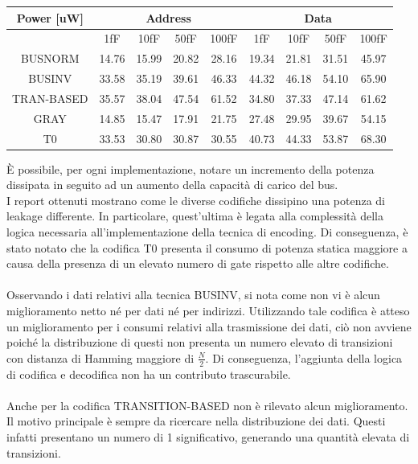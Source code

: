 \documentclass[11pt,  english, makeidx, a4paper, titlepage, oneside]{book}
\begin{document}
\begin{center}
	\begin{tabular}{|c|c|c|c|c||c|c|c|c|}
	\hline
	Power [uW] & \multicolumn{4}{|c||}{Address} & \multicolumn{4}{|c|}{Data}\\
	\hline
	 & 1fF & 10fF & 50fF & 100fF & 1fF & 10fF & 50fF & 100fF \\
	\hline
	BUSNORM & 14.76 & 15.99 & 20.82 & 28.16 & 19.34 & 21.81 & 31.51 & 45.97 \\
	 \hline
	BUSINV & 33.58 & 35.19 & 39.61 & 46.33 & 44.32 & 46.18 & 54.10 & 65.90 \\
	\hline
	TRAN-BASED & 35.57 & 38.04 & 47.54 & 61.52 & 34.80 & 37.33 & 47.14 & 61.62 \\
	\hline
	GRAY & 14.85 & 15.47 & 17.91 & 21.75 & 27.48 & 29.95 & 39.67 & 54.15 \\
	\hline
	T0 & 33.53 & 30.80 & 30.87 & 30.55 & 40.73 & 44.33 & 53.87 & 68.30 \\
	\hline
	\end{tabular}	
\end{center}
\vspace{0.3cm}
È possibile, per ogni implementazione, notare un incremento della potenza dissipata in seguito ad un aumento della capacità di carico del bus.
\\
I report ottenuti mostrano come le diverse codifiche dissipino una potenza di leakage differente. In particolare, quest'ultima è legata alla complessità della logica necessaria all'implementazione della tecnica di encoding. Di conseguenza, è stato notato che la codifica T0 presenta il consumo di potenza statica maggiore a causa della presenza di un elevato numero di gate rispetto alle altre codifiche.
\\\\
Osservando i dati relativi alla tecnica BUSINV, si nota come non vi è alcun miglioramento netto né per dati né per indirizzi. Utilizzando tale codifica è atteso un miglioramento per i consumi relativi alla trasmissione dei dati, ciò non avviene poiché la distribuzione di questi non presenta un numero elevato di transizioni con distanza di Hamming maggiore di $\frac{N}{2}$. Di conseguenza, l'aggiunta della logica di codifica e decodifica non ha un contributo trascurabile.
\\\\
Anche per la codifica TRANSITION-BASED non è rilevato alcun miglioramento. Il motivo principale è sempre da ricercare nella distribuzione dei dati. Questi infatti presentano un numero di 1 significativo, generando una quantità elevata di transizioni.
\end{document}
